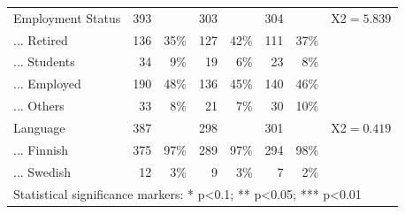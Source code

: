 \begin{table}[!htbp]
{\begin{tabular}{lrrrrrrl}
Employment Status & 393 &  & 303 &  & 304 &  & X2$=5.839^{}$ \\ 
... Retired & 136 & 35\% & 127 & 42\% & 111 & 37\% &  \\ 
... Students & 34 & 9\% & 19 & 6\% & 23 & 8\% &  \\ 
... Employed & 190 & 48\% & 136 & 45\% & 140 & 46\% &  \\ 
... Others & 33 & 8\% & 21 & 7\% & 30 & 10\% &  \\ 
Language & 387 &  & 298 &  & 301 &  & X2$=0.419^{}$ \\ 
... Finnish & 375 & 97\% & 289 & 97\% & 294 & 98\% &  \\ 
... Swedish & 12 & 3\% & 9 & 3\% & 7 & 2\% & \\ 
\hline
\hline
\multicolumn{8}{l}{Statistical significance markers: * p<0.1; ** p<0.05; *** p<0.01}\\ 
\end{tabular}
}
\end{table}



